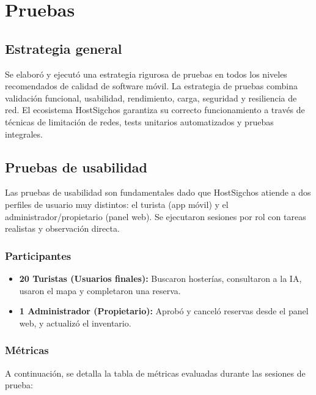 \documentclass[12pt,letterpaper]{report}
\begin{document}
\chapter{Pruebas}

\section{Estrategia general}
Se elaboró y ejecutó una estrategia rigurosa de pruebas en todos los niveles recomendados de calidad de software móvil. La estrategia de pruebas combina validación funcional, usabilidad, rendimiento, carga, seguridad y resiliencia de red. El ecosistema HostSigchos garantiza su correcto funcionamiento a través de técnicas de limitación de redes, tests unitarios automatizados y pruebas integrales.

\section{Pruebas de usabilidad}
Las pruebas de usabilidad son fundamentales dado que HostSigchos atiende a dos perfiles de usuario muy distintos: el turista (app móvil) y el administrador/propietario (panel web). Se ejecutaron sesiones por rol con tareas realistas y observación directa.

\subsection{Participantes}
\begin{itemize}
  \item \textbf{20 Turistas (Usuarios finales):} Buscaron hosterías, consultaron a la IA, usaron el mapa y completaron una reserva.
  \item \textbf{1 Administrador (Propietario):} Aprobó y canceló reservas desde el panel web, y actualizó el inventario.
\end{itemize}

\subsection{Métricas}
A continuación, se detalla la tabla de métricas evaluadas durante las sesiones de prueba:
\end{document}
